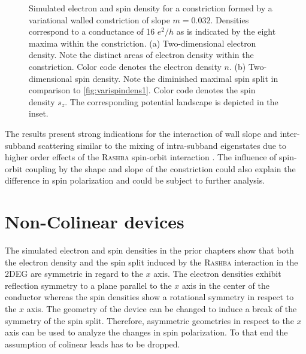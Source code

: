 \begin{figure}[h]
  \hspace{14pt}
  \hspace{4pt}
  \caption{Simulated electron and spin density for a constriction formed by a variational walled constriction of slope $m=0.032$. Densities correspond to a conductance of 16 $e^2/h$ as is indicated by the eight maxima within the constriction. (a) Two-dimensional electron density. Note the distinct areas of electron density within the constriction. Color code denotes the electron density $n$. (b) Two-dimensional spin density. Note the diminished maximal spin split in comparison to \cref{fig:varispindens1}. Color code denotes the spin density $s_z$. The corresponding potential landscape is depicted in the inset.}
\end{figure}
The results present strong indications for the interaction of wall slope and inter-subband scattering similar to the mixing of intra-subband eigenstates due to higher order effects of the \textsc{Rashba} spin-orbit interaction \cite{Wolfgang2003PhysicaE.18.337}. The influence of spin-orbit coupling by the shape and slope of the constriction could also explain the difference in spin polarization and could be subject to further analysis.
\FloatBarrier
\section{Non-Colinear devices}
The simulated electron and spin densities in the prior chapters show that both the electron density and the spin split induced by the \textsc{Rashba} interaction in the 2DEG are symmetric in regard to the $x$ axis. The electron densities exhibit reflection symmetry to a plane parallel to the $x$ axis in the center of the conductor whereas the spin densities show a rotational symmetry in respect to the $x$ axis. The geometry of the device can be changed to induce a break of the symmetry of the spin split. Therefore, asymmetric geometries in respect to the $x$ axis can be used to analyze the changes in spin polarization. To that end the assumption of colinear leads has to be dropped.
